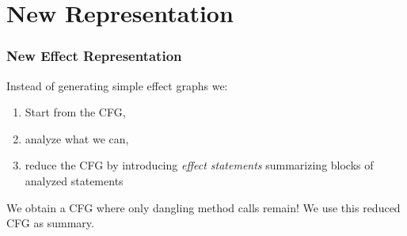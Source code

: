 \documentclass[hyperref={pdfpagelabels=false}]{beamer}
\begin{document}
\section{New Representation}
\begin{frame}[fragile]
\frametitle{New Effect Representation}
    Instead of generating simple effect graphs we:
    \begin{enumerate}
        \item Start from the CFG,
        \item analyze what we can,
        \item reduce the CFG by introducing \emph{effect statements} summarizing
        blocks of analyzed statements
    \end{enumerate}

    \vspace{15pt}
    \pause

    We obtain a CFG where only dangling method calls remain! We use this
    reduced CFG as summary.

\end{frame}
\end{document}

